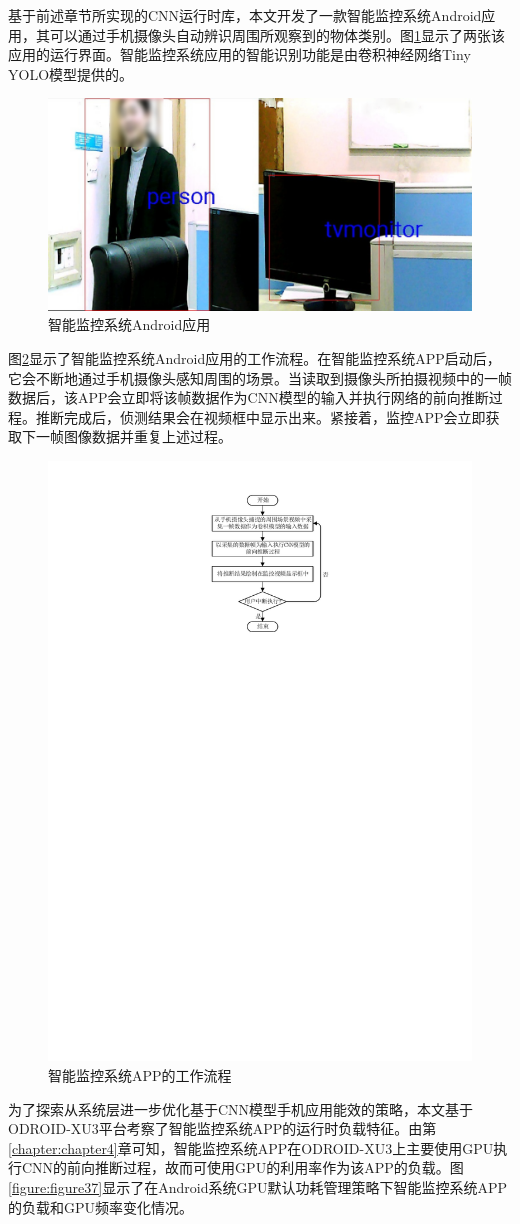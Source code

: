基于前述章节所实现的CNN运行时库，本文开发了一款智能监控系统Android应用，其可以通过手机摄像头自动辨识周围所观察到的物体类别。图\ref{figure:figure31}显示了两张该应用的运行界面。智能监控系统应用的智能识别功能是由卷积神经网络Tiny YOLO\cite{pjreddie.com}模型提供的。

\begin{figure}[htbp]
    \centering
    \includegraphics[height=0.4\textwidth]{figures/app.pdf}
    \caption{智能监控系统Android应用}\label{figure:figure31}
\end{figure}

图\ref{figure:figure36}显示了智能监控系统Android应用的工作流程。在智能监控系统APP启动后，它会不断地通过手机摄像头感知周围的场景。当读取到摄像头所拍摄视频中的一帧数据后，该APP会立即将该帧数据作为CNN模型的输入并执行网络的前向推断过程。推断完成后，侦测结果会在视频框中显示出来。紧接着，监控APP会立即获取下一帧图像数据并重复上述过程。

\begin{figure}[htbp]
    \centering
    \includegraphics[height=0.5\textwidth]{figures/app_process.pdf}
    \caption{智能监控系统APP的工作流程}\label{figure:figure36}
\end{figure}

为了探索从系统层进一步优化基于CNN模型手机应用能效的策略，本文基于ODROID-XU3平台考察了智能监控系统APP的运行时负载特征。由第\ref{chapter:chapter4}章可知，智能监控系统APP在ODROID-XU3上主要使用GPU执行CNN的前向推断过程，故而可使用GPU的利用率作为该APP的负载。图\ref{figure:figure37}显示了在Android系统GPU默认功耗管理策略下智能监控系统APP的负载和GPU频率变化情况。


